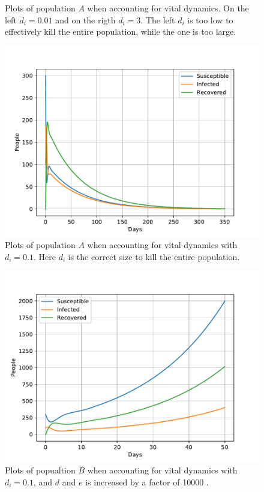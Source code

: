 \documentclass[a4paper]{article}
\begin{document}
\begin{figure}[!htb]
	\caption{Plots of population $A$ when accounting for vital dynamics. On the left $d_i=0.01$ and on the rigth $d_i=3$. The left $d_i$ is too low to effectively kill the entire population, while the one is too large.}
	\includegraphics[scale=0.56]{../plots/opp_c_k2l.pdf}	
	\caption{Plots of population $A$ when accounting for vital dynamics with $d_i=0.1$. Here $d_i$ is the correct size to kill the entire population. }
	\label{opp_c1}
\end{figure}

\begin{figure}[!htb]
	\centering 
	\includegraphics[scale=0.56]{../plots/opp_c_h_100000.pdf} %
	\caption{Plots of popualtion $B$  when accounting for vital dynamics with $d_i=0.1$, and $d$ and $e$ is increased by a factor of 
	10000 
	.}
	\label{opp_c2}
\end{figure}
\end{document}

